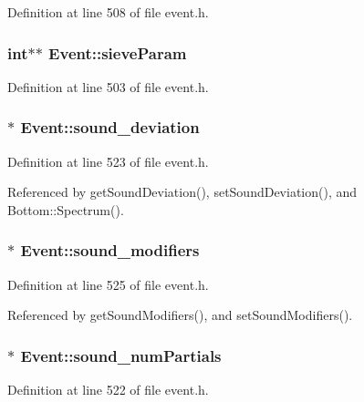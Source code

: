 Definition at line 508 of file event.h.
\subsubsection{\setlength{\rightskip}{0pt plus 5cm}int$\ast$$\ast$ {\bf Event::sieve\-Param}}\label{classEvent_o53}




Definition at line 503 of file event.h.
\subsubsection{$\ast$ {\bf Event::sound\_\-deviation}\hspace{0.3cm}{\tt  [protected]}}\label{classEvent_p3}




Definition at line 523 of file event.h.

Referenced by get\-Sound\-Deviation(), set\-Sound\-Deviation(), and Bottom::Spectrum().
\subsubsection{$\ast$ {\bf Event::sound\_\-modifiers}\hspace{0.3cm}{\tt  [protected]}}\label{classEvent_p5}




Definition at line 525 of file event.h.

Referenced by get\-Sound\-Modifiers(), and set\-Sound\-Modifiers().
\subsubsection{$\ast$ {\bf Event::sound\_\-num\-Partials}\hspace{0.3cm}{\tt  [protected]}}\label{classEvent_p2}




Definition at line 522 of file event.h.

